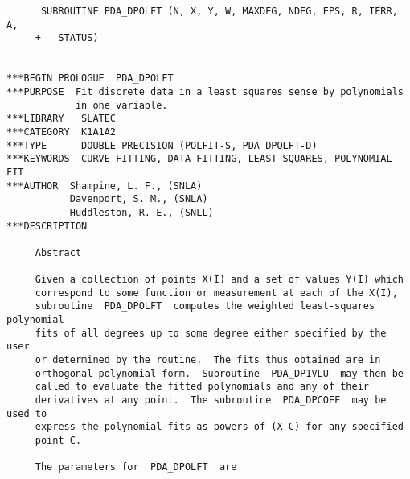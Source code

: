 

\begin{verbatim}
      SUBROUTINE PDA_DPOLFT (N, X, Y, W, MAXDEG, NDEG, EPS, R, IERR, A,
     +   STATUS)


***BEGIN PROLOGUE  PDA_DPOLFT
***PURPOSE  Fit discrete data in a least squares sense by polynomials
            in one variable.
***LIBRARY   SLATEC
***CATEGORY  K1A1A2
***TYPE      DOUBLE PRECISION (POLFIT-S, PDA_DPOLFT-D)
***KEYWORDS  CURVE FITTING, DATA FITTING, LEAST SQUARES, POLYNOMIAL FIT
***AUTHOR  Shampine, L. F., (SNLA)
           Davenport, S. M., (SNLA)
           Huddleston, R. E., (SNLL)
***DESCRIPTION

     Abstract

     Given a collection of points X(I) and a set of values Y(I) which
     correspond to some function or measurement at each of the X(I),
     subroutine  PDA_DPOLFT  computes the weighted least-squares polynomial
     fits of all degrees up to some degree either specified by the user
     or determined by the routine.  The fits thus obtained are in
     orthogonal polynomial form.  Subroutine  PDA_DP1VLU  may then be
     called to evaluate the fitted polynomials and any of their
     derivatives at any point.  The subroutine  PDA_DPCOEF  may be used to
     express the polynomial fits as powers of (X-C) for any specified
     point C.

     The parameters for  PDA_DPOLFT  are


\end{verbatim}
